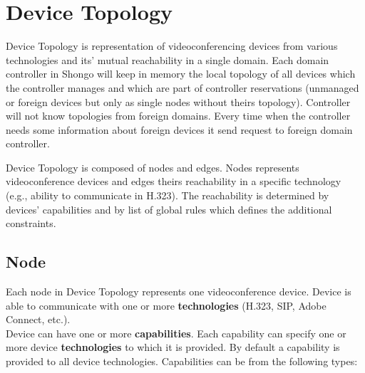 
\chapter{Device Topology}

Device Topology is representation of videoconferencing devices from various 
technologies and its' mutual reachability in a single domain. Each domain 
controller in Shongo will keep in memory the local topology of all devices 
which the controller manages and which are part of controller reservations 
(unmanaged or foreign devices but only as single nodes without theirs 
topology).
Controller will not know topologies from foreign domains. Every time when the 
controller needs some information about foreign devices it send request to 
foreign domain controller.

Device Topology is composed of nodes and edges. Nodes represents 
videoconference devices and edges theirs reachability in a specific technology 
(e.g., ability to communicate in H.323). The reachability is determined by 
devices' capabilities and by list of global rules which defines the additional 
constraints.

\section{Node}

Each node in Device Topology represents one videoconference device. Device is 
able to communicate with one or more \textbf{technologies} (H.323, SIP, Adobe 
Connect, etc.).
\\
Device can have one or more \textbf{capabilities}. Each capability can specify 
one or more device \textbf{technologies} to which it is provided. By default a capability is provided to all device technologies. Capabilities 
can be from the following types:

